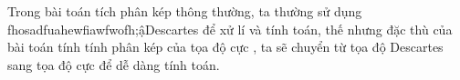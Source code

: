 \documentclass[preview]{standalone}
\begin{document}
\begin{center}
Trong bài toán tích phân kép thông thường, ta thường sử dụng fhosadfuahewfiawfwofh;ậDescartes để xử lí và tính toán, thế nhưng đặc thù của bài toán tính tính phân kép của tọa độ cực , ta sẽ chuyển từ tọa độ Descartes sang tọa độ cực để dễ dàng tính toán.
\end{center}
\end{document}
